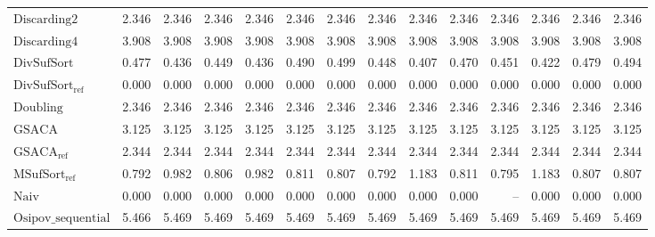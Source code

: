 \begin{table}[h]
{\begin{tabular}{lrrrrrrrrrrrrr}
    $\text{Discarding2}$ & 2.346 & 2.346 & 2.346 & 2.346 & 2.346 & 2.346 & 2.346 & 2.346 & 2.346 & 2.346 & 2.346 & 2.346 & 2.346 \\
    $\text{Discarding4}$ & {\color{red}3.908} & {\color{red}3.908} & {\color{red}3.908} & {\color{red}3.908} & {\color{red}3.908} & {\color{red}3.908} & {\color{red}3.908} & {\color{red}3.908} & {\color{red}3.908} & {\color{red}3.908} & {\color{red}3.908} & {\color{red}3.908} & {\color{red}3.908} \\
    $\text{DivSufSort}$ & 0.477 & 0.436 & 0.449 & 0.436 & 0.490 & 0.499 & 0.448 & 0.407 & 0.470 & 0.451 & 0.422 & 0.479 & 0.494 \\
    $\text{DivSufSort}_{\text{ref}}$ & {\color{green!60!black}0.000} & 0.000 & 0.000 & 0.000 & {\color{green!60!black}0.000} & {\color{green!60!black}0.000} & {\color{green!60!black}0.000} & {\color{green!60!black}0.000} & {\color{green!60!black}0.000} & {\color{green!60!black}0.000} & {\color{green!60!black}0.000} & {\color{green!60!black}0.000} & {\color{green!60!black}0.000} \\
    $\text{Doubling}$ & 2.346 & 2.346 & 2.346 & 2.346 & 2.346 & 2.346 & 2.346 & 2.346 & 2.346 & 2.346 & 2.346 & 2.346 & 2.346 \\
    $\text{GSACA}$ & 3.125 & 3.125 & 3.125 & 3.125 & 3.125 & 3.125 & 3.125 & 3.125 & 3.125 & 3.125 & 3.125 & 3.125 & 3.125 \\
    $\text{GSACA}_{\text{ref}}$ & 2.344 & 2.344 & 2.344 & 2.344 & 2.344 & 2.344 & 2.344 & 2.344 & 2.344 & 2.344 & 2.344 & 2.344 & 2.344 \\
    $\text{MSufSort}_{\text{ref}}$ & 0.792 & 0.982 & 0.806 & 0.982 & 0.811 & 0.807 & 0.792 & 1.183 & 0.811 & 0.795 & 1.183 & 0.807 & 0.807 \\
    $\text{Naiv}$ & {\color{green!60!black}0.000} & {\color{green!60!black}0.000} & {\color{green!60!black}0.000} & {\color{green!60!black}0.000} & {\color{green!60!black}0.000} & {\color{green!60!black}0.000} & {\color{green!60!black}0.000} & {\color{green!60!black}0.000} & {\color{green!60!black}0.000} & {\color{darkgray}--} & {\color{green!60!black}0.000} & {\color{green!60!black}0.000} & {\color{green!60!black}0.000} \\
    $\text{Osipov\_sequential}$ & {\color{red}5.466} & {\color{red}5.469} & {\color{red}5.469} & {\color{red}5.469} & {\color{red}5.469} & {\color{red}5.469} & {\color{red}5.469} & {\color{red}5.469} & {\color{red}5.469} & {\color{red}5.469} & {\color{red}5.469} & {\color{red}5.469} & {\color{red}5.469} \\

\end{tabular}}
\end{table}
